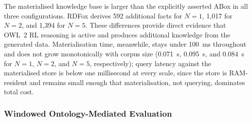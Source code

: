 The materialised knowledge base is larger than the explicitly asserted ABox in
all three configurations. RDFox derives 592 additional facts for $N=1$,
1{,}017 for $N=2$, and 1{,}394 for $N=5$. These differences provide direct
evidence that OWL~2 RL reasoning is active and produces additional knowledge
from the generated data. Materialisation time, meanwhile, stays under 100~ms
throughout and does not grow monotonically with corpus size (0.071~s,
0.095~s, and 0.084~s for $N=1$, $N=2$, and $N=5$, respectively); query
latency against the materialised store is below one millisecond at every
scale, since the store is RAM-resident and remains small enough that
materialisation, not querying, dominates total cost.

\subsubsection{Windowed Ontology-Mediated Evaluation}
\label{subsubsec:genact-rdfox-windowed}

